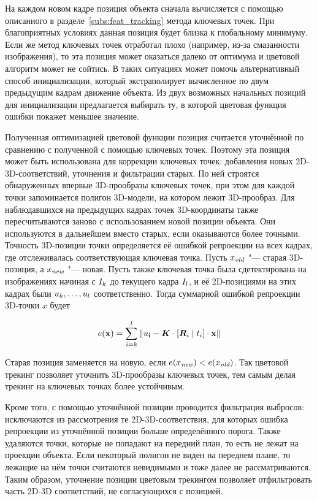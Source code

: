 На каждом новом кадре позиция объекта сначала вычисляется с помощью
описанного в разделе~\ref{subs:feat_tracking} метода ключевых точек.
При благоприятных условиях данная позиция будет близка к глобальному минимуму.
Если же метод ключевых точек отработал плохо (например, из-за смазанности
изображения), то эта позиция может оказаться далеко от оптимума и цветовой
алгоритм может не сойтись.
В таких ситуациях может помочь альтернативный способ инициализации,
который экстраполирует вычисленное по двум предыдущим кадрам движение объекта.
Из двух возможных начальных позиций для инициализации предлагается выбирать ту,
в которой цветовая функция ошибки покажет меньшее значение.

Полученная оптимизацией цветовой функции позиция считается уточнённой по
сравнению с полученной с помощью ключевых точек.
Поэтому эта позиция может быть использована для коррекции ключевых
точек: добавления новых 2D-3D-соответствий, уточнения и фильтрации старых.
По ней строятся обнаруженных впервые 3D-прообразы ключевых точек, при этом для
каждой точки запоминается полигон 3D-модели, на котором лежит 3D-прообраз.
Для наблюдавшихся на предыдущих кадрах точек 3D-координаты также
пересчитываются заново с использованием новой позиции объекта.
Они используются в дальнейшем вместо старых, если оказываются более точными.
Точность 3D-позиции точки определяется её ошибкой репроекции на всех кадрах,
где отслеживалась соответствующая ключевая точка.
Пусть $\mathnormal{x_{\text {\it old}}}$ "--- старая 3D-позиция, а $\mathnormal{x_{\text{\it new}}}$ "--- новая.
Пусть также ключевая точка была сдетектирована на изображениях начиная с
$I_k$
до текущего кадра $I_l$, и её 2D-позициями на этих кадрах были
$\mathnormal{u}_k, \ldots, \mathnormal{u}_l$ соответственно.
Тогда суммарной ошибкой репроекции 3D-точки $x$ будет

\begin{equation}
\label{eqn:sum_reproj}
\mathnormal{e}( \mathbf{x} ) = \sum\limits_{i = k}^l \| \mathbf{\mathnormal{u}_i} - \bm{K} \cdot
[\bm{R}_i \mid \mathnormal{t}_i] \cdot \mathbf{x} \|
\end{equation}

Старая позиция заменяется на новую, если $\mathnormal{e}( \mathnormal{x_{\text{\it new}}} ) < \mathnormal{e}( \mathnormal{x_{\text {\it old}}} )$.
Так цветовой трекинг позволяет уточнить 3D-прообразы ключевых точек, тем самым
делая трекинг на ключевых точках более устойчивым.

Кроме того, с помощью уточнённой позиции проводится фильтрация выбросов:
исключаются из рассмотрения те 2D-3D-соответствия, для которых ошибка
репроекции из уточнённой позиции больше определённого порога.
Также удаляются точки, которые не попадают на передний план, то есть не лежат
на проекции объекта.
Если некоторый полигон не виден на переднем плане, то лежащие на нём точки
считаются невидимыми и тоже далее не рассматриваются.
Таким образом, уточнение позиции цветовым трекингом позволяет отфильтровать
часть 2D-3D соответствий, не согласующихся с позицией.

